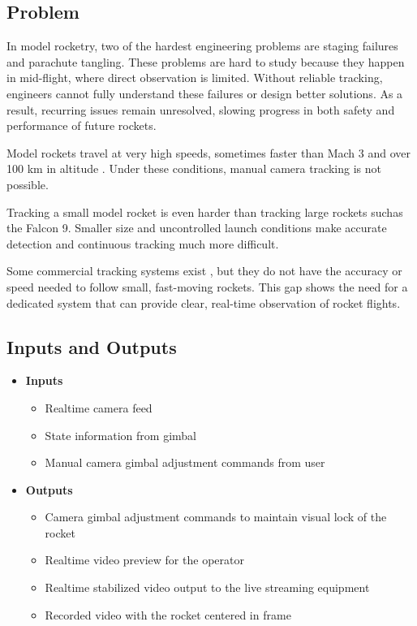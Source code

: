 \documentclass{article}
\begin{document}

\subsection{Problem}

In model rocketry, two of the hardest engineering problems are staging failures
and parachute tangling. These problems are hard to study because they happen in
mid-flight, where direct observation is limited. Without reliable tracking,
engineers cannot fully understand these failures or design better solutions. As
a result, recurring issues remain unresolved, slowing progress in both safety
and performance of future rockets.

Model rockets travel at very high speeds, sometimes faster than Mach 3 and over
100 km in altitude \citep{SpaceConcordiaRocketry2025}. Under these conditions,
manual camera tracking is not possible.

Tracking a small model rocket is even harder than tracking large rockets suchas
the Falcon 9. Smaller size and uncontrolled launch conditions make accurate
detection and continuous tracking much more difficult.

Some commercial tracking systems exist \citep{AverTR3XX2021}, but they do not
have the accuracy or speed needed to follow small, fast-moving rockets. This
gap shows the need for a dedicated system that can provide clear, real-time
observation of rocket flights.

\subsection{Inputs and Outputs}
\begin{itemize}
  \item \textbf{Inputs}
        \begin{itemize}
          \item Realtime camera feed
          \item State information from gimbal
          \item Manual camera gimbal adjustment commands from user
        \end{itemize}

  \item \textbf{Outputs}
        \begin{itemize}
          \item Camera gimbal adjustment commands to maintain visual lock of the rocket
          \item Realtime video preview for the operator
          \item Realtime stabilized video output to the live streaming equipment
          \item Recorded video with the rocket centered in frame
        \end{itemize}
\end{itemize}
\end{document}
